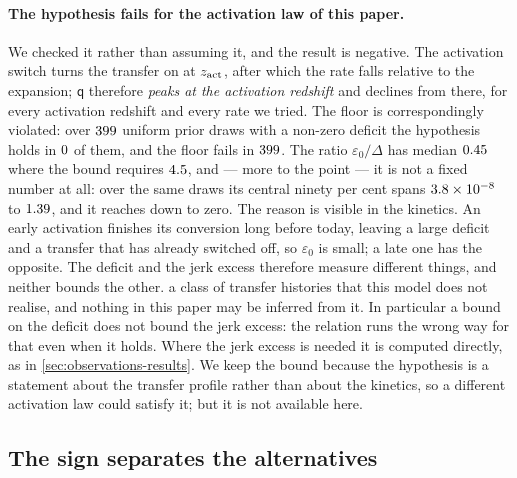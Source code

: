 \paragraph{The hypothesis fails for the activation law of this paper.} We
checked it rather than assuming it, and the result is negative. The activation
switch turns the transfer on at $z_{\mathrm{act}}$, after which the rate falls relative to
the expansion; $\mathsf q$ therefore \emph{peaks at the activation redshift} and
declines from there, for every activation redshift and every rate we tried. The
floor is correspondingly violated: over
$399$ uniform prior draws with a non-zero
deficit the hypothesis holds in $0$ of
them, and the floor fails in
$399$. The ratio $\varepsilon_0/\Delta$ has
median $0.45$ where the bound requires
$4.5$, and --- more to the point --- it is
not a fixed number at all: over the same draws its central ninety per cent
spans $\num{3.8e-08}$ to $1.39$, and
it reaches down to zero. The reason
is visible in the kinetics. An early activation finishes its conversion long
before today, leaving a large deficit and a transfer that has already switched
off, so $\varepsilon_0$ is small; a late one has the opposite. The deficit and
the jerk excess therefore measure different things, and neither bounds the
other.
a class of transfer histories that this model does not realise, and nothing in
this paper may be inferred from it. In particular a bound on the deficit does
not bound the jerk excess: the relation runs the wrong way for that even when
it holds. Where the jerk excess is needed it is computed directly, as in
\cref{sec:observations-results}. We keep the bound because the hypothesis is a
statement about the transfer profile rather than about the kinetics, so a
different activation law could satisfy it; but it is not available here.

\subsection{The sign separates the alternatives}\label{sec:cosmography-signs}

